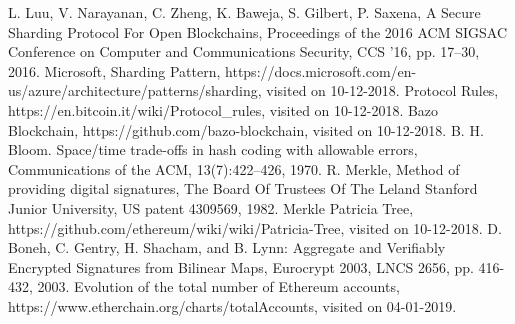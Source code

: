 \documentclass[conference]{IEEEtran}
\begin{document}
\begin{thebibliography}{00}
 L. Luu, V. Narayanan, C. Zheng, K. Baweja, S. Gilbert, P. Saxena, A Secure Sharding Protocol For Open Blockchains, Proceedings of the 2016 ACM SIGSAC Conference on Computer and Communications Security, CCS '16, pp. 17--30, 2016.
 Microsoft, Sharding Pattern, https://docs.microsoft.com/en-us/azure/architecture/patterns/sharding, visited on 10-12-2018.
 Protocol Rules, https://en.bitcoin.it/wiki/Protocol\_rules, visited on 10-12-2018.
 Bazo Blockchain, https://github.com/bazo-blockchain, visited on 10-12-2018.
 B. H. Bloom. Space/time trade-offs in hash coding with allowable errors, Communications of the ACM, 13(7):422–426, 1970.
 R. Merkle, Method of providing digital signatures, The Board Of Trustees Of The Leland Stanford Junior University, US patent 4309569, 1982.
 Merkle Patricia Tree, https://github.com/ethereum/wiki/wiki/Patricia-Tree, visited on 10-12-2018.
 D. Boneh, C. Gentry, H. Shacham, and B. Lynn: Aggregate and Verifiably Encrypted Signatures from Bilinear Maps, Eurocrypt 2003, LNCS 2656, pp. 416-432, 2003.
 Evolution of the total number of Ethereum accounts, https://www.etherchain.org/charts/totalAccounts, visited on 04-01-2019.

\end{thebibliography}
\end{document}
